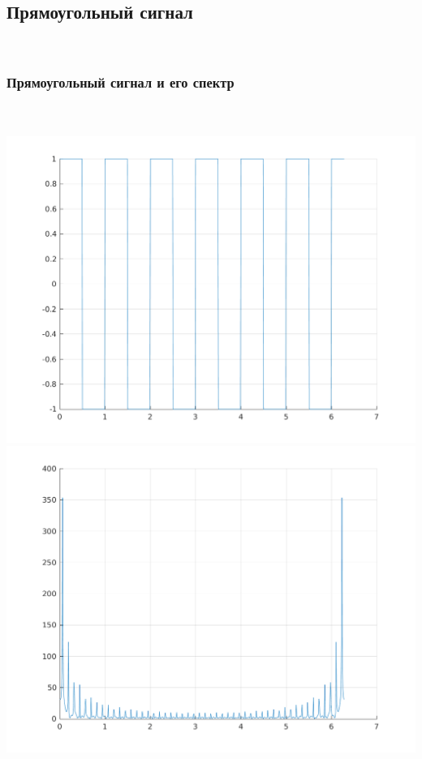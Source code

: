 \documentclass[a4paper]{article}
\begin{document}
\subsection{Прямоугольный сигнал}\\
\subsubsection{Прямоугольный сигнал и его спектр}\\
\\
\includegraphics[scale=0.7]{lab3/figures/figure_6.png}\\
\includegraphics[scale=0.7]{lab3/figures/figure_7.png}\\
\end{document}
